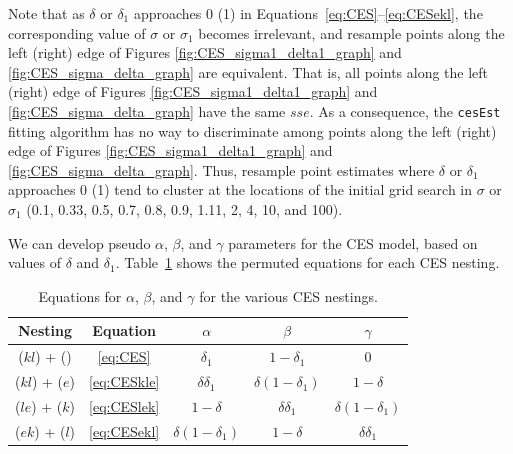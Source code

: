 \documentclass[preprint,authoryear,12pt]{elsarticle}\usepackage[]{graphicx}\usepackage[]{color}
\begin{document}
Note that as $\delta$ or $\delta_1$ approaches 0 (1) 
in Equations~\ref{eq:CES}--\ref{eq:CESekl},
the corresponding value of $\sigma$ or $\sigma_1$ becomes irrelevant, and
resample points along the left (right) edge of
Figures \ref{fig:CES_sigma1_delta1_graph} and \ref{fig:CES_sigma_delta_graph}
are equivalent.
That is, all points along the left (right) edge of
Figures \ref{fig:CES_sigma1_delta1_graph} and \ref{fig:CES_sigma_delta_graph}
have the same $sse$. 
As a consequence, 
the \texttt{cesEst} fitting algorithm has no way 
to discriminate among points along the left (right) edge of
Figures \ref{fig:CES_sigma1_delta1_graph} and \ref{fig:CES_sigma_delta_graph}. 
Thus, resample point estimates where $\delta$ or $\delta_1$ approaches 0 (1)
tend to cluster at the locations of the initial grid search in 
$\sigma$ or $\sigma_1$
(0.1, 0.33, 0.5, 0.7, 0.8, 0.9, 1.11, 2, 4, 10, and 100).







We can develop pseudo $\alpha$, $\beta$, and $\gamma$ parameters 
for the CES model, based on values of $\delta$ and $\delta_1$.
Table~\ref{tab:CES_abg_equations} shows the permuted equations for each CES nesting.

\begin{table} \caption{Equations for $\alpha$, $\beta$, and $\gamma$ for the various CES nestings.} 
\label{tab:CES_abg_equations} 
  \begin{center}
    \begin{tabular}{c c c c c} 
      \toprule
      Nesting    & Equation        & $\alpha$                & $\beta$                 & $\gamma$       \\
      \midrule
      ($kl$) + ()     & \ref{eq:CES}    & $\delta_1$              & $1 - \delta_1$          & 0          \\
      ($kl$) + ($e$)  & \ref{eq:CESkle} & $\delta \delta_1$       & $\delta (1 - \delta_1)$ & $1 - \delta$ \\   
      ($le$) + ($k$)  & \ref{eq:CESlek} & $1 - \delta$            & $\delta \delta_1$       & $\delta (1 - \delta_1)$ \\
      ($ek$) + ($l$)  & \ref{eq:CESekl} & $\delta (1 - \delta_1)$ & $1 - \delta$            & $\delta \delta_1$ \\
      \bottomrule
    \end{tabular}
  \end{center}
\end{table}
\end{document}
